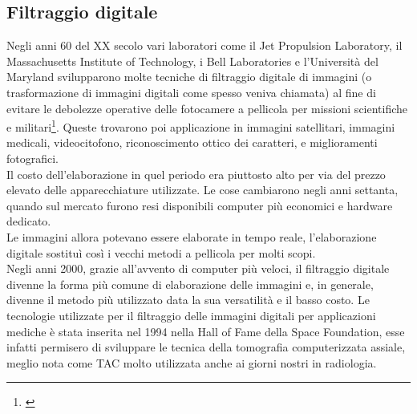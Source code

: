 \subsection{Filtraggio digitale}
Negli anni 60 del XX secolo vari laboratori come il Jet Propulsion Laboratory, il Massachusetts Institute of Technology, i Bell Laboratories e l'Università del Maryland svilupparono molte tecniche di filtraggio digitale di immagini (o trasformazione di immagini digitali come spesso veniva chiamata) al fine di evitare le debolezze operative delle fotocamere a pellicola per missioni scientifiche e militari\footnote{\cite{storia}}. Queste trovarono poi applicazione in immagini satellitari, immagini medicali, videocitofono, riconoscimento ottico dei caratteri, e miglioramenti fotografici.\\
\noindent
Il costo dell'elaborazione in quel periodo era piuttosto alto per via del prezzo elevato delle apparecchiature utilizzate. Le cose cambiarono negli anni settanta, quando sul mercato furono resi disponibili computer più economici e hardware dedicato.\\
Le immagini allora potevano essere elaborate in tempo reale, l'elaborazione digitale sostituì così i vecchi metodi a pellicola per molti scopi.\\

\noindent
Negli anni 2000, grazie all'avvento di computer più veloci, il filtraggio digitale divenne la forma più comune di elaborazione delle immagini e, in generale, divenne il metodo più utilizzato data la sua versatilità e il basso costo.
\noindent
Le tecnologie utilizzate per il filtraggio delle immagini digitali per applicazioni mediche è stata inserita nel 1994 nella Hall of Fame della Space Foundation, esse infatti permisero di sviluppare le tecnica della tomografia computerizzata assiale, meglio nota come TAC molto utilizzata anche ai giorni nostri in radiologia.\\
